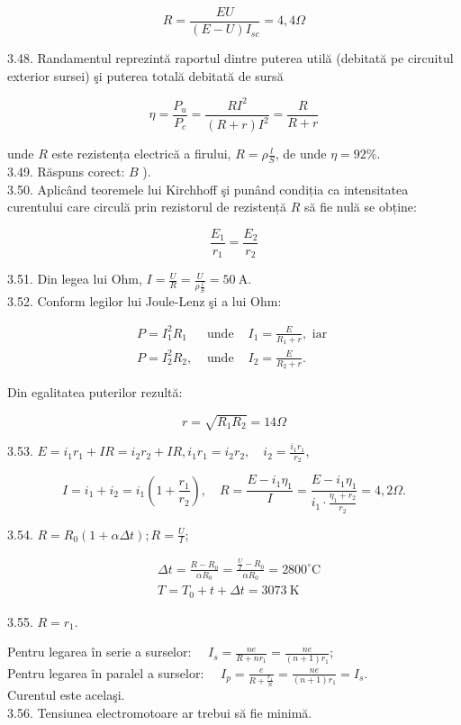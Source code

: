 $$
R=\frac{E U}{(E-U) I_{s c}}=4,4 \Omega
$$

3.48. Randamentul reprezintă raportul dintre puterea utilă (debitată pe circuitul exterior sursei) şi puterea totală debitată de sursă

$$
\eta=\frac{P_{u}}{P_{c}}=\frac{R I^{2}}{(R+r) I^{2}}=\frac{R}{R+r}
$$

unde $R$ este rezistența electrică a firului, $R=\rho \frac{l}{S}$, de unde $\eta=92 \%$.\\
3.49. Răspuns corect: $B$ ).\\
3.50. Aplicând teoremele lui Kirchhoff şi punând condiția ca intensitatea curentului care circulă prin rezistorul de rezistență $R$ să fie nulă se obține:

$$
\frac{E_{1}}{r_{1}}=\frac{E_{2}}{r_{2}}
$$

3.51. Din legea lui Ohm, $I=\frac{U}{R}=\frac{U}{\rho \frac{l}{S}}=50 \mathrm{~A}$.\\
3.52. Conform legilor lui Joule-Lenz şi a lui Ohm:

$$
\begin{array}{lll}
P=I_{1}^{2} R_{1} & \text { unde } & I_{1}=\frac{E}{R_{1}+r}, \text { iar } \\
P=I_{2}^{2} R_{2}, & \text { unde } & I_{2}=\frac{E}{R_{2}+r} .
\end{array}
$$

Din egalitatea puterilor rezultă:

$$
r=\sqrt{R_{1} R_{2}}=14 \Omega
$$

3.53. $E=i_{1} r_{1}+I R=i_{2} r_{2}+I R, i_{1} r_{1}=i_{2} r_{2}, \quad i_{2}=\frac{i_{1} r_{1}}{r_{2}}$,

$$
I=i_{1}+i_{2}=i_{1}\left(1+\frac{r_{1}}{r_{2}}\right), \quad R=\frac{E-i_{1} \eta_{1}}{I}=\frac{E-i_{1} \eta_{1}}{i_{1} \cdot \frac{\eta_{1}+r_{2}}{r_{2}}}=4,2 \Omega .
$$

3.54. $R=R_{0}(1+\alpha \Delta t) ; R=\frac{U}{I}$;

$$
\begin{aligned}
& \Delta t=\frac{R-R_{0}}{\alpha R_{0}}=\frac{\frac{U}{I}-R_{0}}{\alpha R_{0}}=2800^{\circ} \mathrm{C} \\
& T=T_{0}+t+\Delta t=3073 \mathrm{~K}
\end{aligned}
$$

3.55. $R=r_{1}$.

Pentru legarea în serie a surselor: $\quad I_{s}=\frac{n e}{R+n r_{1}}=\frac{n e}{(n+1) r_{1}}$;\\
Pentru legarea în paralel a surselor: $\quad I_{p}=\frac{e}{R+\frac{r_{1}}{n}}=\frac{n e}{(n+1) r_{1}}=I_{s}$.\\
Curentul este acelaşi.\\
3.56. Tensiunea electromotoare ar trebui să fie minimă.

